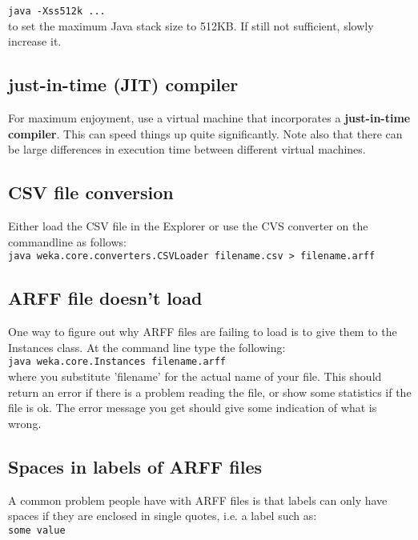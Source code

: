 \verb=java -Xss512k ...=\\

\noindent to set the maximum Java stack size to 512KB. If still not
sufficient, slowly increase it.

\subsection{just-in-time (JIT) compiler}
For maximum enjoyment, use a virtual machine that incorporates a
\textbf{just-in-time compiler}. This can speed things up quite
significantly. Note also that there can be large differences in
execution time between different virtual machines.

\subsection{CSV file conversion}
Either load the CSV file in the Explorer or use the CVS converter on
the commandline as follows:\\

\verb=java weka.core.converters.CSVLoader filename.csv > filename.arff=\\

\subsection{ARFF file doesn't load}
One way to figure out why ARFF files are failing to load is to give
them to the Instances class. At the command line type the following:\\

\verb=java weka.core.Instances filename.arff=\\

\noindent where you substitute 'filename' for the actual name of your
file. This should return an error if there is a problem reading the
file, or show some statistics if the file is ok. The error message you
get should give some indication of what is wrong.

\subsection{Spaces in labels of ARFF files}
A common problem people have with ARFF files is that labels can only
have spaces if they are enclosed in single quotes, i.e. a label such
as:\\

\verb=some value=\\

